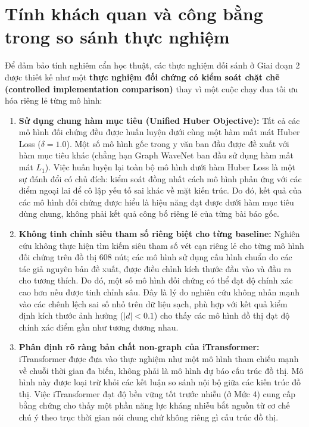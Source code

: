 \section{Tính khách quan và công bằng trong so sánh thực nghiệm}
\label{sec:tinh_cong_bang_thuc_nghiem}

Để đảm bảo tính nghiêm cẩn học thuật, các thực nghiệm đối sánh ở Giai đoạn 2 được thiết kế như một \textbf{thực nghiệm đối chứng có kiểm soát chặt chẽ (controlled implementation comparison)} thay vì một cuộc chạy đua tối ưu hóa riêng lẻ từng mô hình:

\begin{enumerate}
    \item \textbf{Sử dụng chung hàm mục tiêu (Unified Huber Objective):} Tất cả các mô hình đối chứng đều được huấn luyện dưới cùng một hàm mất mát Huber Loss ($\delta=1.0$). Một số mô hình gốc trong y văn ban đầu được đề xuất với hàm mục tiêu khác (chẳng hạn Graph WaveNet ban đầu sử dụng hàm mất mát $L_1$). Việc huấn luyện lại toàn bộ mô hình dưới hàm Huber Loss là một sự đánh đổi có chủ đích: kiểm soát đồng nhất cách mô hình phản ứng với các điểm ngoại lai để cô lập yếu tố sai khác về mặt kiến trúc. Do đó, kết quả của các mô hình đối chứng được hiểu là hiệu năng đạt được dưới hàm mục tiêu dùng chung, không phải kết quả công bố riêng lẻ của từng bài báo gốc.
    \item \textbf{Không tinh chỉnh siêu tham số riêng biệt cho từng baseline:} Nghiên cứu không thực hiện tìm kiếm siêu tham số vét cạn riêng lẻ cho từng mô hình đối chứng trên đồ thị 608 nút; các mô hình sử dụng cấu hình chuẩn do các tác giả nguyên bản đề xuất, được điều chỉnh kích thước đầu vào và đầu ra cho tương thích. Do đó, một số mô hình đối chứng có thể đạt độ chính xác cao hơn nếu được tinh chỉnh sâu. Đây là lý do nghiên cứu không nhấn mạnh vào các chênh lệch sai số nhỏ trên dữ liệu sạch, phù hợp với kết quả kiểm định kích thước ảnh hưởng ($|d| < 0.1$) cho thấy các mô hình đồ thị đạt độ chính xác điểm gần như tương đương nhau.
    \item \textbf{Phân định rõ ràng bản chất non-graph của iTransformer:} iTransformer được đưa vào thực nghiệm như một mô hình tham chiếu mạnh về chuỗi thời gian đa biến, không phải là mô hình dự báo cấu trúc đồ thị. Mô hình này được loại trừ khỏi các kết luận so sánh nội bộ giữa các kiến trúc đồ thị. Việc iTransformer đạt độ bền vững tốt trước nhiễu (ở Mức 4) cung cấp bằng chứng cho thấy một phần năng lực kháng nhiễu bắt nguồn từ cơ chế chú ý theo trục thời gian nói chung chứ không riêng gì cấu trúc đồ thị.
\end{enumerate}

